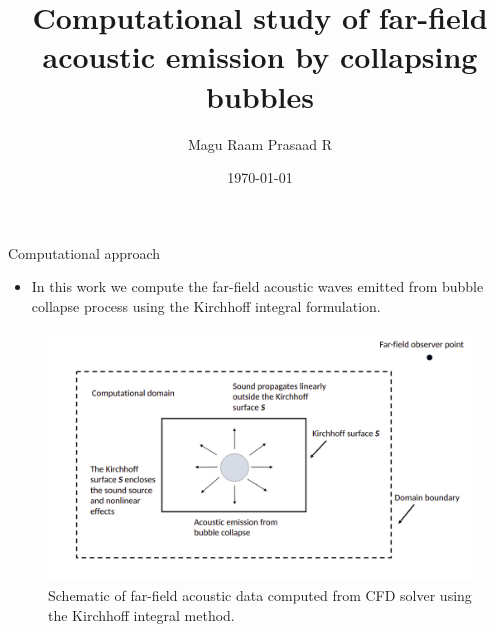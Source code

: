 \documentclass[10pt, aspectratio=169]{beamer}
\title{Computational study of far-field acoustic emission by collapsing bubbles}
\date{\today}
\author[shortname]{Magu Raam Prasaad R}
\institute[shortinst]{Indian Institute of Science, Bangalore}
\begin{document}
\begin{frame}
	\maketitle
\end{frame}

\begin{frame}{Computational approach}
	
	\begin{itemize}
		\item In this work we compute the far-field acoustic waves emitted from bubble collapse process using the Kirchhoff integral formulation.
	\end{itemize}

	\begin{figure}
		\centering
		\includegraphics[scale=0.22]{images/shematic1.png}
		\caption{Schematic of far-field acoustic data computed from CFD solver using the Kirchhoff integral method.}
	\end{figure}		

\end{frame}
\end{document}
